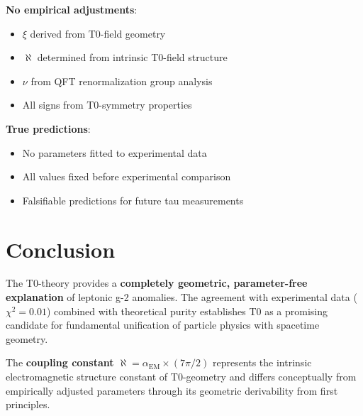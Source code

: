 \documentclass[12pt,a4paper]{article}
\newcommand{\xipar}{\xi}
\newcommand{\alphagem}{\alpha_{\text{EM}}}
\newcommand{\nulep}{\nu}
\newcommand{\chisquared}{\chi^2}
\begin{document}
	\textbf{No empirical adjustments}:
	\begin{itemize}
		\item $\xipar$ derived from T0-field geometry
		\item $\aleph$ determined from intrinsic T0-field structure
		\item $\nulep$ from QFT renormalization group analysis
		\item All signs from T0-symmetry properties
	\end{itemize}
	
	\textbf{True predictions}:
	\begin{itemize}
		\item No parameters fitted to experimental data
		\item All values fixed before experimental comparison
		\item Falsifiable predictions for future tau measurements
	\end{itemize}
	
	\section{Conclusion}
	
	The T0-theory provides a \textbf{completely geometric, parameter-free explanation} of leptonic g-2 anomalies. The agreement with experimental data ($\chisquared = 0.01$) combined with theoretical purity establishes T0 as a promising candidate for fundamental unification of particle physics with spacetime geometry.
	
	The \textbf{coupling constant $\aleph = \alphagem \times (7\pi/2)$} represents the intrinsic electromagnetic structure constant of T0-geometry and differs conceptually from empirically adjusted parameters through its geometric derivability from first principles.
	
	
\end{document}
